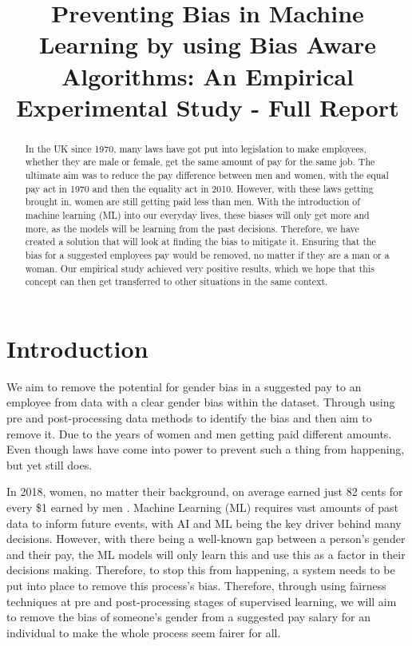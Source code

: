 \documentclass{sigchi}
\def\plaintitle{Preventing Bias in Machine Learning by using Bias Aware Algorithms: An Empirical Experimental Study - Full Report}
\begin{document}
\title{\plaintitle}

\author{%
}



\maketitle

\begin{abstract}
	In the UK since 1970, many laws have got put into legislation to make employees, whether they are male or female, get the same amount of pay for the same job. The ultimate aim was to reduce the pay difference between men and women, with the equal pay act in 1970 and then the equality act in 2010. However, with these laws getting brought in, women are still getting paid less than men. With the introduction of machine learning (ML) into our everyday lives, these biases will only get more and more, as the models will be learning from the past decisions. Therefore, we have created a solution that will look at finding the bias to mitigate it. Ensuring that the bias for a suggested employees pay would be removed, no matter if they are a man or a woman. Our empirical study achieved very positive results, which we hope that this concept can then get transferred to other situations in the same context.
\end{abstract}


\section{Introduction}

	We aim to remove the potential for gender bias in a suggested pay to an employee from data with a clear gender bias within the dataset. Through using pre and post-processing data methods to identify the bias and then aim to remove it. Due to the years of women and men getting paid different amounts. Even though laws have come into power to prevent such a thing from happening, but yet still does.

	In 2018, women, no matter their background, on average earned just 82 cents for every \$1 earned by men \cite{1}. Machine Learning (ML) requires vast amounts of past data to inform future events, with AI and ML being the key driver behind many decisions. However, with there being a well-known gap between a person's gender and their pay, the ML models will only learn this and use this as a factor in their decisions making. Therefore, to stop this from happening, a system needs to be put into place to remove this process's bias. Therefore, through using fairness techniques at pre and post-processing stages \cite{three} of supervised learning, we will aim to remove the bias of someone's gender from a suggested pay salary for an individual to make the whole process seem fairer for all. %
\end{document}
